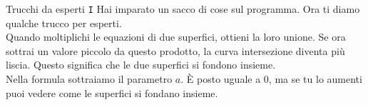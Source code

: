 \begin{surferPage}{Trucchi da esperti {\tt I}}
Hai imparato un sacco di cose sul programma. Ora ti diamo qualche trucco per esperti.\\
\vspace{0.3cm}
Quando moltiplichi le equazioni di due superfici, ottieni la loro unione. Se ora sottrai un valore piccolo da questo prodotto, la curva intersezione diventa pi\`u liscia. Questo significa che le due superfici si fondono insieme.\\
\vspace{0.3cm}
Nella formula sottraiamo il parametro $a$. \`E posto uguale a $0$, ma se tu lo aumenti puoi vedere come le superfici si fondano insieme.
\end{surferPage}
